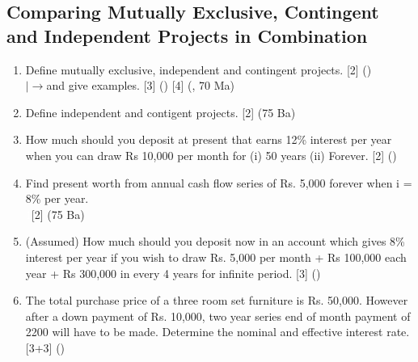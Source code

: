 \documentclass[12pt]{article}
\newcommand{\lb}{\\ $\left|\rightarrow\right.$}
\newcommand{\enter}{\\\textcolor{white}{1}}
\begin{document}
	\subsection{Comparing Mutually Exclusive, Contingent and Independent Projects in Combination}
		\begin{enumerate}[noitemsep, topsep = 0pt]
			\item Define mutually exclusive, independent and contingent projects. \hfill [2] ()
			\lb and give examples. \hfill [3] () [4] (, 70 Ma)
			
			\item Define independent and contigent projects. \hfill [2] (75 Ba)
			
			\item How much should you deposit at present that earns 12\% interest per year when you can draw Rs 10,000 per month for (i) 50 years (ii) Forever. \hfill [2] ()
			
			\item Find present worth from annual cash flow series of Rs. 5,000 forever when i = 8\% per year.
			\enter\hfill [2] (75 Ba)
			
			\item (Assumed) How much should you deposit now in an account which gives 8\% interest per year if you wish to draw Rs. 5,000 per month + Rs 100,000 each year + Rs 300,000 in every 4 years for infinite period. \hfill [3] ()
			
			\item The total purchase price of a three room set furniture is Rs. 50,000. However after a down payment of Rs. 10,000, two year series end of month payment of 2200 will have to be made. Determine the nominal and effective interest rate. \hfill [3+3] ()
			

\end{enumerate}
\end{document}
